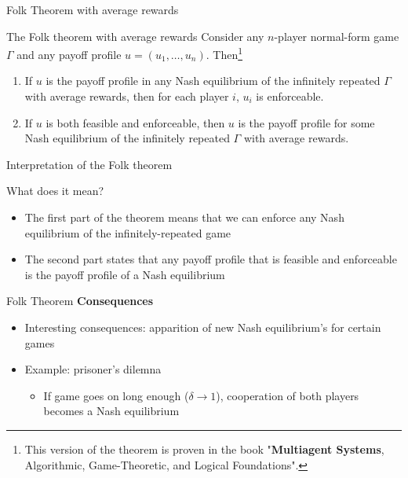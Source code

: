 \begin{frame}{Folk Theorem with average rewards}

    \begin{block}{The Folk theorem with average rewards}
        Consider any $n$-player normal-form game $\Gamma$ and any payoff profile
        $u = (u_1, \dots, u_n)$. Then\footnote{This version of the theorem is proven
        in the book "\textbf{Multiagent Systems}, Algorithmic, Game-Theoretic, and Logical
        Foundations".}
        \begin{enumerate}
            \item If $u$ is the payoff profile in any Nash equilibrium of the infinitely
            repeated $\Gamma$ with average rewards, then for each player $i$, $u_i$ is enforceable.
            \item If $u$ is both feasible and enforceable, then $u$ is the payoff profile for some
            Nash equilibrium of the infinitely repeated $\Gamma$ with average rewards.
        \end{enumerate}
    \end{block}
\end{frame}


\begin{frame}{Interpretation of the Folk theorem}
    \begin{exampleblock}{What does it mean?}
        \begin{itemize}
            \item The first part of the theorem means that we can enforce any Nash equilibrium
            of the infinitely-repeated game
            \item The second part states that any payoff profile that is feasible and enforceable
            is the payoff profile of a Nash equilibrium 
        \end{itemize}
    \end{exampleblock}
\end{frame}

\begin{frame}{Folk Theorem}
    \textbf{Consequences}\\
    \begin{itemize}
        \item Interesting consequences: apparition of new Nash equilibrium's for certain games
        \item Example: prisoner's dilemna
        \begin{itemize}
            \item If game goes on long enough ($\delta \rightarrow 1$), cooperation of both
            players becomes a Nash equilibrium
        \end{itemize}
    \end{itemize}
\end{frame}

